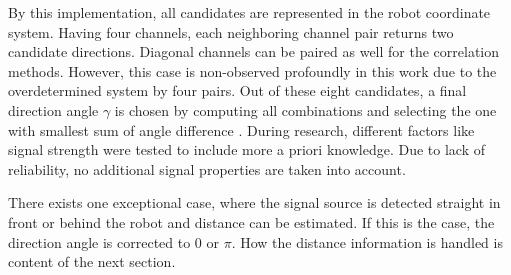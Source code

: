 By this implementation, all candidates are represented in the robot coordinate system.
Having four channels, each neighboring channel pair returns two candidate directions.
Diagonal channels can be paired as well for the correlation methods.
However, this case is non-observed profoundly in this work due to the overdetermined
system by four pairs.
Out of these eight candidates, a final direction angle $\gamma$ is chosen
by computing all combinations and selecting the one with smallest sum of angle difference .
During research, different factors like signal strength  were tested to include
more a priori knowledge.
Due to lack of reliability, no additional signal properties are taken into account.

There exists one exceptional case, where the signal source is detected straight in front
or behind the robot and distance can be estimated.
If this is the case, the direction angle is corrected to 0 or $\pi$.
How the distance information is handled is content of the next section.
